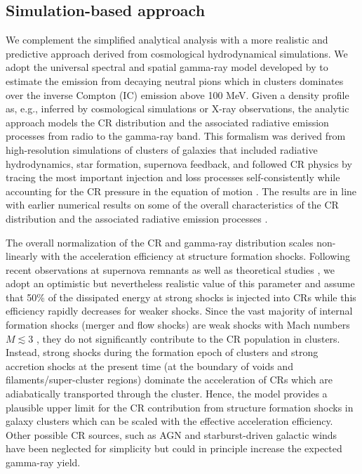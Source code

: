 \documentclass[12pt,manuscript]{aastex}
\begin{document}
\subsection{Simulation-based approach}
\label{sec:simulation}
We complement the simplified analytical analysis with a more realistic and predictive approach
derived from cosmological hydrodynamical simulations. We adopt the universal spectral and spatial
gamma-ray model developed by \citet{article:PinzkePfrommer:2010} to estimate the emission from
decaying neutral pions which in clusters dominates over the inverse Compton (IC) emission above
100 MeV. Given a density profile as, e.g., inferred by
cosmological simulations or X-ray observations, the analytic approach models the CR distribution and
the associated radiative emission processes from radio to the gamma-ray band. This formalism was
derived from high-resolution simulations of clusters of galaxies that included radiative
hydrodynamics,
star formation, supernova feedback, and followed CR physics by tracing the most important injection
and loss processes self-consistently while accounting for the CR pressure in the equation of motion
\citep{article:PfrommerSpringelEnsslinJubelgas, article:EnsslinPfrommerSpringelJubelgas:2007,
article:JubelgasSpringelEnsslinPfrommer:2008}. The results are in line with earlier numerical
results on some of the overall characteristics of the CR distribution and the associated radiative
emission processes \citep{article:DolagEnsslin:2000, article:MiniatiRyuKangJones:2001,
article:Miniati:2003, article:Pfrommer_etal:2007, article:PfrommerEnsslinSpringel:2008,
article:Pfrommer:2008}.
 
The overall normalization of the CR and gamma-ray distribution scales non-linearly with the
acceleration efficiency at structure formation shocks. Following recent observations at supernova
remnants \citep{article:Helder_etal:2009} as well as theoretical studies
\citep{article:KangJones:2005}, we adopt an optimistic but nevertheless realistic value of this
parameter and assume that 50\% of the dissipated energy at strong shocks is injected into CRs while
this efficiency rapidly decreases for weaker shocks. Since the vast majority of internal formation
shocks (merger and flow shocks) are weak shocks with Mach numbers $M\lesssim3$
\citep[e.g.,][]{article:Ryu_etal:2003}, they do not significantly contribute to the CR population in
clusters. Instead, strong shocks during the formation epoch of clusters and strong accretion shocks
at the present time (at the boundary of voids and filaments/super-cluster regions) dominate the
acceleration of CRs which are adiabatically transported through the cluster. Hence, the
model provides a plausible upper limit for the CR contribution from structure formation shocks in
galaxy clusters which can be scaled with the effective acceleration efficiency. Other possible CR
sources, such as AGN and starburst-driven galactic winds have been neglected for simplicity but
could in principle increase the expected gamma-ray yield.
\end{document}
